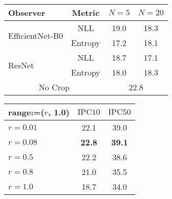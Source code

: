 \begin{table}[t]
\scriptsize
\centering
\begin{minipage}{0.55\columnwidth}
    \label{tab:dataset-cropping}
    \setlength{\tabcolsep}{0.5em}
    \centering
    \begin{tabular}{@{}lc|cc@{}}
    \toprule
    Observer                         & Metric  & $N=5$      & $N=20$      \\ \midrule
    \multirow{2}{*}{EfficientNet-B0} & NLL     & 19.0       & 18.3        \\
                                     & Entropy & 17.2       & 18.1        \\ \midrule
    \multirow{2}{*}{ResNet}          & NLL     & 18.7       & 17.1        \\
                                     & Entropy & 18.0       & 18.3        \\ \midrule
    \multicolumn{2}{c|}{No Crop}               & \multicolumn{2}{c}{22.8} \\ \bottomrule
    \end{tabular}
\end{minipage}
\hfill
\begin{minipage}{0.38\columnwidth}
    \label{tab:training-cropping}
    \setlength{\tabcolsep}{0.3em}
    \centering
    \begin{tabular}{@{}lcc@{}}
    \toprule
    range:=($r$, 1.0)      & $\text{IPC}10$      & $\text{IPC}50$      \\ \midrule
    $r=0.01$          & 22.1          & 39.0          \\
    $r=0.08$          & \textbf{22.8} & \textbf{39.1} \\
    $r=0.5$           & 22.2          & 38.6          \\
    $r=0.8$           & 21.0          & 35.5          \\
    $r=1.0$           & 18.7          & 34.0          \\ \bottomrule
    \end{tabular}
\end{minipage}
\end{table}